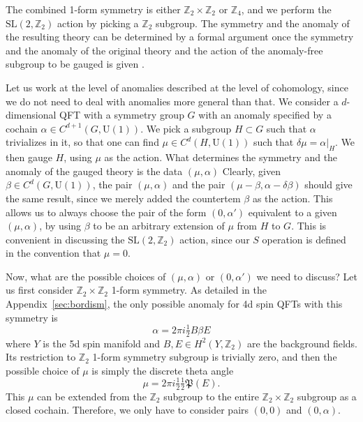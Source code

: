 \documentclass[12pt]{article}
\numberwithin{equation}{section}
\def\bZ{\mathbb{Z}}
\def\fP{\mathfrak{P}}
\def\U{\mathrm{U}}
\def\SL{\mathrm{SL}}
\begin{document}
The combined 1-form symmetry is either $\bZ_2\times \bZ_2$ or $\bZ_4$,
and we perform the $\SL(2,\bZ_2)$ action  by picking a $\bZ_2$ subgroup.
The symmetry and the anomaly of the resulting theory can be determined by a formal argument once the symmetry and the anomaly of the original theory 
and the action of the anomaly-free subgroup to be gauged is given \cite{Tachikawa:2017gyf}.

Let us work at the level of anomalies described at the level of cohomology, since we do not need to deal with anomalies more general than that.
We consider a $d$-dimensional QFT with a symmetry group $G$ with an anomaly specified by a cochain $\alpha\in C^{d+1}(G,\U(1))$. 
We pick a subgroup $H\subset G$ such that $\alpha$ trivializes in it, so that one can find $\mu \in C^d(H,\U(1))$ such that $\delta \mu = \alpha|_H$. 
We then gauge $H$, using $\mu$ as the action.
What determines the symmetry and the anomaly of the gauged theory is the data $(\mu,\alpha)$
Clearly, given $\beta\in C^d(G,\U(1))$, the pair $(\mu,\alpha)$ and the pair $(\mu-\beta,\alpha-\delta\beta)$ should give the same result, since we merely added the countertem $\beta$ as the action.
This allows us to always choose the pair of the form $(0,\alpha')$ equivalent to a given $(\mu,\alpha)$, 
by using $\beta$ to be an arbitrary extension of $\mu$ from $H$ to $G$.
This is convenient in discussing the $\SL(2,\bZ_2)$ action,
since our $S$ operation is defined in the convention that $\mu=0$.

Now, what are the possible choices of $(\mu,\alpha)$ or $(0,\alpha')$ we need to discuss?
Let us first consider $\bZ_2\times \bZ_2$ 1-form symmetry.
As detailed in the Appendix~\ref{sec:bordism}, the only possible anomaly for 4d spin QFTs with this symmetry is \begin{equation}
\alpha=2\pi i \tfrac12  B\beta E  \label{anom}
\end{equation} where $Y$ is the 5d spin manifold and $B,E\in H^2(Y,\bZ_2)$ are the background fields.
Its restriction to $\bZ_2$ 1-form symmetry subgroup is trivially zero,
and then the possible choice of $\mu$ is simply the discrete theta angle \begin{equation}
\mu = 2\pi i \tfrac12  \tfrac12\fP(E).\label{P}
\end{equation}
This $\mu$ can be extended from the $\bZ_2$ subgroup to the entire $\bZ_2\times \bZ_2$ subgroup as a closed cochain.
Therefore, we only have to consider pairs $(0,0)$ and $(0,\alpha)$.
\end{document}
